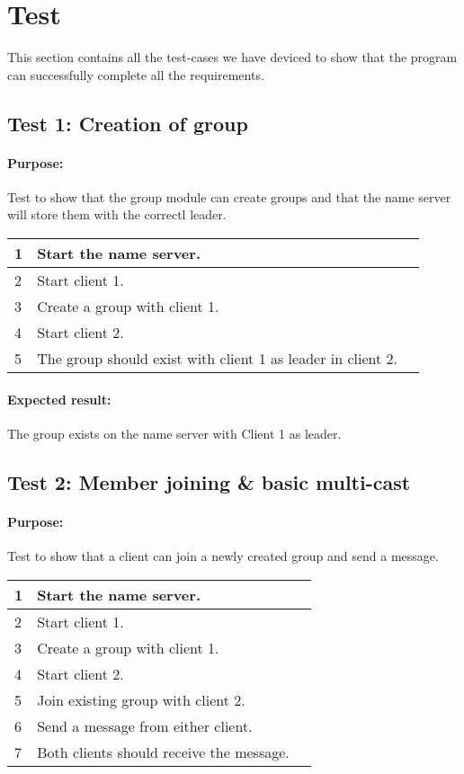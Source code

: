 \section{Test}
This section contains all the test-cases we have deviced to show that the program can successfully complete all the requirements. 

\subsection*{Test 1: Creation of group}
\paragraph{Purpose:} Test to show that the group module can create groups and that the name server will store them with the correctl leader. 
\begin{table}[h!]
	\begin{tabularx}{\textwidth}{|l|X|p{8pt}|}
		\hline
		1 & Start the name server. & \\
		\hline
		2 & Start client 1. & \\
		\hline
		3 & Create a group with client 1. &  \\
		\hline
		4 & Start client 2. & \\
		\hline
		5 & The group should exist with client 1 as leader in client 2. & \\
		\hline
	\end{tabularx}
\end{table}

\paragraph{Expected result:} The group exists on the name server with Client 1 as leader.

\subsection*{Test 2: Member joining \& basic multi-cast}
\paragraph{Purpose: } Test to show that a client can join a newly created group and send a message.
\begin{table}[h!]
	\begin{tabularx}{\textwidth}{|l|X|p{8pt}|}
		\hline
		1 & Start the name server. & \\
		\hline
		2 & Start client   1. & \\
		\hline
		3 & Create a group with client 1. & \\
		\hline
		4 & Start client   2. & \\
		\hline
		5 & Join existing group with client 2. & \\
		\hline
		6 & Send a message from either client. & \\
		\hline
		7 & Both clients should receive the message.  & \\
		\hline		
	\end{tabularx}
\end{table}
